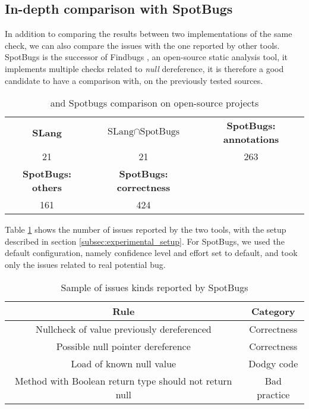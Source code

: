 \subsection{In-depth comparison with SpotBugs}
\label{subsec:indpeth_comparison_spotbugs}

In addition to comparing the results between two implementations of the same check, we can also compare the issues with the one reported by other tools.
SpotBugs \cite{spotBugs:2019:Online} is the successor of Findbugs \cite{FindBugs:2019:Online}, an open-source static analysis tool, it implements multiple checks related to \emph{null} dereference, it is therefore a good candidate to have a comparison with, on the previously tested sources.

\begin{table}[h]
	\centering
	\caption{\slang{} and Spotbugs comparison on open-source projects}
	\label{table:slang_vs_spotbugs}
	\begin{tabular}{|c|c|c|}
		\hline
		\bf SLang & \bf $\text{SLang} \cap \text{SpotBugs}$ & \bf SpotBugs: annotations \\
		21 & 21 & 263 \\ \hline
		\bf SpotBugs: others & \bf SpotBugs: correctness & \\ 
		161 & 424 &  \\ \hline
	\end{tabular}
\end{table}

Table \ref{table:slang_vs_spotbugs} shows the number of issues reported by the two tools, with the setup described in section \ref{subsec:experimental_setup}. 
For SpotBugs, we used the default configuration, namely confidence level and effort set to default, and took only the issues related to real potential bug.

\begin{table}[h]
	\centering
	\caption{Sample of issues kinds reported by SpotBugs}
	\label{table:spotbugs-rules}
	\begin{tabular}{|c|c|}
		\hline
		\bf Rule & \bf Category\\ \hline
		Nullcheck of value previously dereferenced & Correctness  \\
		Possible null pointer dereference & Correctness  \\
		Load of known null value & Dodgy code \\
		Method with Boolean return type should not return null & Bad practice \\ \hline
	\end{tabular}
\end{table}

